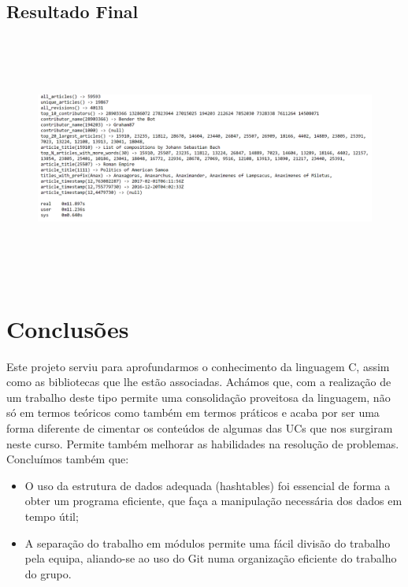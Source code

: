 \documentclass[a4paper]{article}
\begin{document}
\subsection{Resultado Final}

\begin{figure}[htbp]
    \centering
    \includegraphics[width = 420pt, height = 230pt]{output}
\end{figure}

\section{Conclusões}
\label{sec:conclusao}
Este projeto serviu para aprofundarmos o conhecimento da linguagem C, assim como as bibliotecas que lhe estão associadas. Achámos que, com a realização de um trabalho deste tipo permite uma consolidação proveitosa da linguagem, não só em termos teóricos como também em termos práticos e acaba por ser uma forma diferente de cimentar os conteúdos de algumas das UCs que nos surgiram neste curso. Permite também melhorar as habilidades na resolução de problemas. Concluímos também que:

\begin{itemize}
        \item O uso da estrutura de dados adequada (hashtables) foi essencial de forma a obter um programa eficiente, que faça a manipulação necessária dos dados em tempo útil;
 	    \item A separação do trabalho em módulos permite uma fácil divisão do trabalho pela equipa, aliando-se ao uso do Git numa organização eficiente do trabalho do grupo.
\end{itemize}
\end{document}
